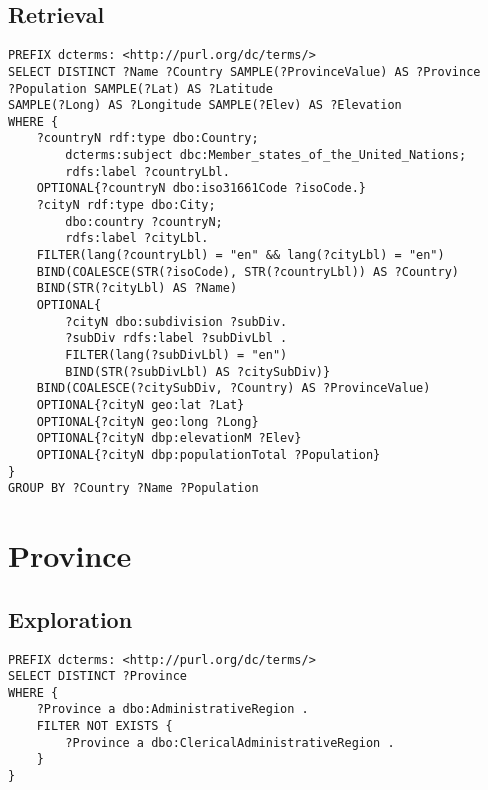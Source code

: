 \documentclass[11pt]{article}
\begin{document}
\subsection{Retrieval}
{\footnotesize\begin{verbatim}
PREFIX dcterms: <http://purl.org/dc/terms/>
SELECT DISTINCT ?Name ?Country SAMPLE(?ProvinceValue) AS ?Province
?Population SAMPLE(?Lat) AS ?Latitude
SAMPLE(?Long) AS ?Longitude SAMPLE(?Elev) AS ?Elevation
WHERE {
    ?countryN rdf:type dbo:Country;
        dcterms:subject dbc:Member_states_of_the_United_Nations;
        rdfs:label ?countryLbl.
    OPTIONAL{?countryN dbo:iso31661Code ?isoCode.}
    ?cityN rdf:type dbo:City;
        dbo:country ?countryN;
        rdfs:label ?cityLbl.
    FILTER(lang(?countryLbl) = "en" && lang(?cityLbl) = "en")
    BIND(COALESCE(STR(?isoCode), STR(?countryLbl)) AS ?Country)
    BIND(STR(?cityLbl) AS ?Name)
    OPTIONAL{ 
        ?cityN dbo:subdivision ?subDiv.
        ?subDiv rdfs:label ?subDivLbl .
        FILTER(lang(?subDivLbl) = "en")
        BIND(STR(?subDivLbl) AS ?citySubDiv)}
    BIND(COALESCE(?citySubDiv, ?Country) AS ?ProvinceValue)
    OPTIONAL{?cityN geo:lat ?Lat}
    OPTIONAL{?cityN geo:long ?Long}
    OPTIONAL{?cityN dbp:elevationM ?Elev}
    OPTIONAL{?cityN dbp:populationTotal ?Population}
}
GROUP BY ?Country ?Name ?Population
\end{verbatim}}

\section{Province}

\subsection{Exploration}
{\footnotesize\begin{verbatim}
PREFIX dcterms: <http://purl.org/dc/terms/>
SELECT DISTINCT ?Province
WHERE {
    ?Province a dbo:AdministrativeRegion .
    FILTER NOT EXISTS {
        ?Province a dbo:ClericalAdministrativeRegion .
    }
}    
\end{verbatim}
}
\end{document}
